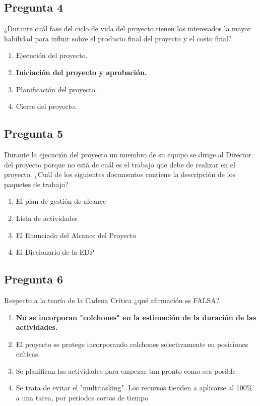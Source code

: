 \documentclass[11pt,a4paper]{article}
\begin{document}
\subsection*{Pregunta 4}
¿Durante cuál fase del ciclo de vida del proyecto tienen los interesados la mayor habilidad para influir sobre el producto final del proyecto y el costo final?

\begin{enumerate}[label=\alph*)]
  \item Ejecución del proyecto.
  \item \textbf{Iniciación del proyecto y aprobación.}
  \item Planificación del proyecto.
  \item Cierre del proyecto.
\end{enumerate}

\subsection*{Pregunta 5}
Durante la ejecución del proyecto un miembro de su equipo se dirige al Director del proyecto porque no está de cuál es el trabajo que debe de realizar en el proyecto. ¿Cuál de los siguientes documentos contiene la descripción de los paquetes de trabajo?

\begin{enumerate}[label=\alph*)]
  \item El plan de gestión de alcance
  \item Lista de actividades
  \item El Enunciado del Alcance del Proyecto
  \item El Diccionario de la EDP
\end{enumerate}

\subsection*{Pregunta 6}
Respecto a la teoría de la Cadena Crítica ¿qué afirmación es FALSA?

\begin{enumerate}[label=\alph*)]
  \item \textbf{No se incorporan "colchones" en la estimación de la duración de las actividades.}
  \item El proyecto se protege incorporando colchones selectivamente en posiciones críticas.
  \item Se planifican las actividades para empezar tan pronto como sea posible
  \item Se trata de evitar el "multitasking". Los recursos tienden a aplicarse al 100\% a una tarea, por períodos cortos de tiempo
\end{enumerate}
\end{document}
